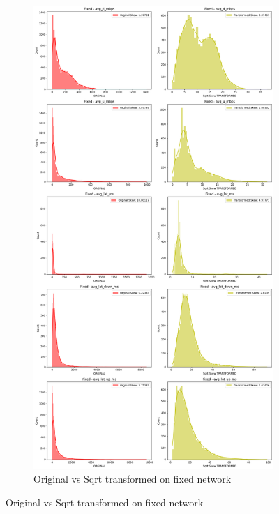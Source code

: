 \documentclass[
  letterpaper,
  DIV=11,
  numbers=noendperiod,
  oneside]{scrartcl}
\begin{document}
\begin{figure}
{\begin{figure}[H]
{\centering \includegraphics{data-analytics_files/figure-latex/fig-transcomp-output-1.png}

}

\caption{Original vs Sqrt transformed on fixed network}

\end{figure}

}
\end{figure}
\end{document}
